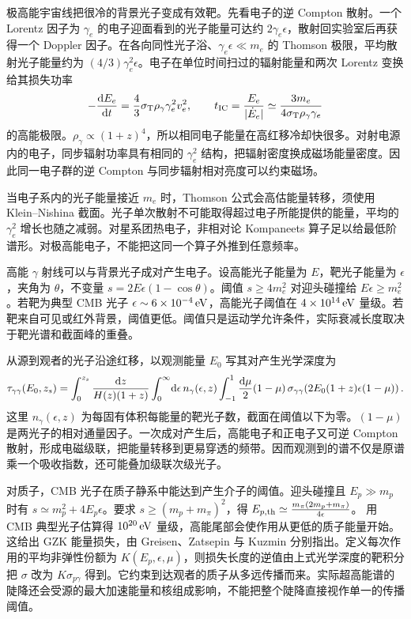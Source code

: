 极高能宇宙线把很冷的背景光子变成有效靶。先看电子的逆 Compton 散射。一个 Lorentz 因子为 $\gamma_e$ 的电子迎面看到的光子能量可达约 $2\gamma_e\epsilon$，散射回实验室后再获得一个 Doppler 因子。在各向同性光子浴、$\gamma_e\epsilon\ll m_e$ 的 Thomson 极限，平均散射光子能量约为 $(4/3)\gamma_e^2\epsilon$。电子在单位时间扫过的辐射能量和两次 Lorentz 变换给其损失功率
\[
 -\frac{\dd E_e}{\dd t}=\frac43\sigma_{\rm T}\rho_\gamma\gamma_e^2v_e^2,\qquad
 t_{\rm IC}=\frac{E_e}{|\dot E_e|}
 \simeq\frac{3m_e}{4\sigma_{\rm T}\rho_\gamma\gamma_e}
\]
的高能极限。$\rho_\gamma\propto(1+z)^4$，所以相同电子能量在高红移冷却快很多。对射电源内的电子，同步辐射功率具有相同的 $\gamma_e^2$ 结构，把辐射密度换成磁场能量密度。因此同一电子群的逆 Compton 与同步辐射相对亮度可以约束磁场。

当电子系内的光子能量接近 $m_e$ 时，Thomson 公式会高估能量转移，须使用 Klein--Nishina 截面。光子单次散射不可能取得超过电子所能提供的能量，平均的 $\gamma_e^2$ 增长也随之减弱。对星系团热电子，非相对论 Kompaneets 算子足以给最低阶谱形。对极高能电子，不能把这同一个算子外推到任意频率。

高能 $\gamma$ 射线可以与背景光子成对产生电子。设高能光子能量为 $E$，靶光子能量为 $\epsilon$，夹角为 $\theta$，不变量 $s=2E\epsilon(1-\cos\theta)$。阈值 $s\geq4m_e^2$ 对迎头碰撞给 $E\epsilon\geq m_e^2$。若靶为典型 CMB 光子 $\epsilon\sim6\times10^{-4}\,{\rm eV}$，高能光子阈值在 $4\times10^{14}\,{\rm eV}$ 量级。若靶来自可见或红外背景，阈值更低。阈值只是运动学允许条件，实际衰减长度取决于靶光谱和截面峰的重叠。

从源到观者的光子沿途红移，以观测能量 $E_0$ 写其对产生光学深度为
\[
 \tau_{\gamma\gamma}(E_0,z_s)=
 \int_0^{z_s}\frac{\dd z}{H(z)(1+z)}
 \int_0^\infty\!\dd\epsilon\,n_\gamma(\epsilon,z)
 \int_{-1}^{1}\frac{\dd\mu}{2}(1-\mu)\,
 \sigma_{\gamma\gamma}\!\left(2E_0(1+z)\epsilon(1-\mu)\right).
\]
这里 $n_\gamma(\epsilon,z)$ 为每固有体积每能量的靶光子数，截面在阈值以下为零。$(1-\mu)$ 是两光子的相对通量因子。一次成对产生后，高能电子和正电子又可逆 Compton 散射，形成电磁级联，把能量转移到更易穿透的频带。因而观测到的谱不仅是原谱乘一个吸收指数，还可能叠加级联次级光子。

对质子，CMB 光子在质子静系中能达到产生介子的阈值。迎头碰撞且 $E_p\gg m_p$ 时有 $s\simeq m_p^2+4E_p\epsilon$。要求 $s\geq(m_p+m_\pi)^2$，得 $E_{p,{\rm th}}\simeq\frac{m_\pi(2m_p+m_\pi)}{4\epsilon}$。
用 CMB 典型光子估算得 $10^{20}\,{\rm eV}$ 量级，高能尾部会使作用从更低的质子能量开始。这给出 GZK 能量损失，由 Greisen、Zatsepin 与 Kuzmin 分别指出。定义每次作用的平均非弹性份额为 $K(E_p,\epsilon,\mu)$，则损失长度的逆值由上式光学深度的靶积分把 $\sigma$ 改为 $K\sigma_{p\gamma}$ 得到。它约束到达观者的质子从多远传播而来。实际超高能谱的陡降还会受源的最大加速能量和核组成影响，不能把整个陡降直接视作单一的传播阈值。


